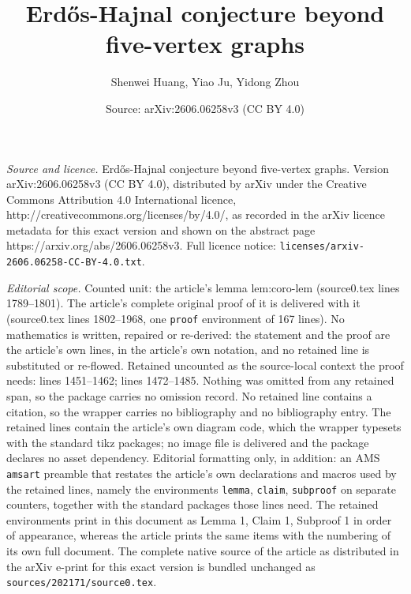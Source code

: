 \documentclass[10pt,a4paper]{amsart}
\title{Erd\H{o}s-Hajnal conjecture beyond five-vertex graphs}
\author{Shenwei Huang, Yiao Ju, Yidong Zhou}
\date{Source: arXiv:2606.06258v3 (CC BY 4.0)}
\begin{document}
\maketitle

\noindent\emph{Source and licence.} Erd\H{o}s-Hajnal conjecture beyond five-vertex graphs. Version arXiv:2606.06258v3 (CC BY 4.0), distributed by arXiv under the Creative Commons Attribution 4.0 International licence, http://creativecommons.org/licenses/by/4.0/, as recorded in the arXiv licence metadata for this exact version and shown on the abstract page https://arxiv.org/abs/2606.06258v3. Full licence notice: \texttt{licenses/arxiv-2606.06258-CC-BY-4.0.txt}.\par\smallskip

\noindent\textit{Editorial scope.} Counted unit: the article's lemma lem:coro-lem (source0.tex lines 1789--1801). The article's complete original proof of it is delivered with it (source0.tex lines 1802--1968, one \texttt{proof} environment of 167 lines). No mathematics is written, repaired or re-derived: the statement and the proof are the article's own lines, in the article's own notation, and no retained line is substituted or re-flowed.  Retained uncounted as the source-local context the proof needs: lines 1451--1462; lines 1472--1485.  Nothing was omitted from any retained span, so the package carries no omission record.  No retained line contains a citation, so the wrapper carries no bibliography and no bibliography entry.  The retained lines contain the article's own diagram code, which the wrapper typesets with the standard tikz packages; no image file is delivered and the package declares no asset dependency.  Editorial formatting only, in addition: an AMS \texttt{amsart} preamble that restates the article's own declarations and macros used by the retained lines, namely the environments \texttt{lemma}, \texttt{claim}, \texttt{subproof} on separate counters, together with the standard packages those lines need.  The retained environments print in this document as Lemma 1, Claim 1, Subproof 1 in order of appearance, whereas the article prints the same items with the numbering of its own full document.  The complete native source of the article as distributed in the arXiv e-print for this exact version is bundled unchanged as \texttt{sources/202171/source0.tex}.
\end{document}
